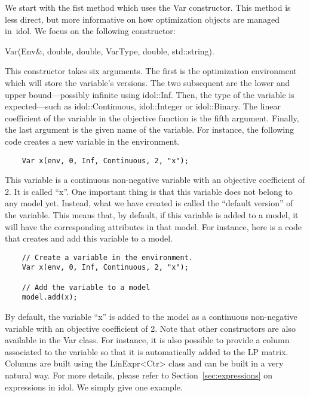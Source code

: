 We start with the fist method which uses the \textsf{Var} constructor. This
method is less direct, but more informative on how optimization objects are
managed in~\textsf{idol}. We focus on the following constructor:
\begin{center}
    \textsf{Var(Env\&, double, double, VarType, double, std::string)}.
\end{center}
This constructor takes six arguments. The first is the optimization
environment which will store the variable's versions. The two subsequent are
the lower and upper bound---possibly infinite using \textsf{idol::Inf}.
Then, the type of the variable is expected---such as
\textsf{idol::Continuous}, \textsf{idol::Integer} or \textsf{idol::Binary}.
The linear coefficient of the variable in the objective function is the fifth
argument. Finally, the last argument is the given name of the variable. For
instance, the following code creates a new variable in the environment.

\begin{lstlisting}
    Var x(env, 0, Inf, Continuous, 2, "x");
\end{lstlisting}
This variable is a continuous non-negative variable with an objective
coefficient of 2. It is called ``\textsf{x}''. One important thing is that
this variable does not belong to any model yet. Instead, what we have created
is called the ``default version'' of the variable. This means that, by
default, if this variable is added to a model, it will have the corresponding
attributes in that model. For instance, here is a code that creates and add
this variable to a model.

\begin{lstlisting}
    // Create a variable in the environment.
    Var x(env, 0, Inf, Continuous, 2, "x");

    // Add the variable to a model 
    model.add(x);
\end{lstlisting}

By default, the variable ``\textsf{x}'' is added to the model as a continuous
non-negative variable with an objective coefficient of 2. Note that other
constructors are also available in the \textsf{Var} class. For instance, it is
also possible to provide a column associated to the variable so that it is
automatically added to the LP matrix. Columns are built using the
\textsf{LinExpr<Ctr>} class and can be built in a very natural way. For more
details, please refer to Section~\ref{sec:expressions} on expressions in
\textsf{idol}. We simply give one example. 

